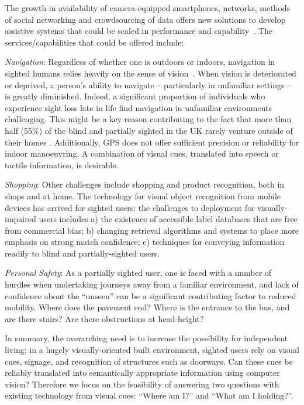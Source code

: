 The growth in availability of camera-equipped smartphones, networks, methods of social networking and crowdsourcing of data offers new solutions to develop assistive systems that could be scaled in performance and capability~\cite{Manduchi2012,Worsfold2010}. The services/capabilities that could be offered include:

\emph{Navigation}: Regardless of whether one is outdoors or indoors, navigation in sighted humans relies heavily on the sense of vision~\citep{kalia2008learning,tsuji2005landmarks}. When vision is deteriorated or deprived, a person's ability to navigate -- particularly in unfamiliar settings -- is greatly diminished. Indeed, a significant proportion of individuals who experience sight loss late in life find navigation in unfamiliar environments challenging. This might be a key reason contributing to the fact that more than half (55\%) of the blind and partially sighted in the UK rarely venture outside of their homes \citep{Worsfold2010}. Additionally, GPS does not offer sufficient precision or reliability for indoor manoeuvring. A combination of visual cues, translated into speech or tactile information, is desirable.

\emph{Shopping}: Other challenges include shopping and product recognition, both in shops and at home. The technology for visual object recognition from mobile devices has arrived for sighted users: the challenges to deployment for visually-impaired users includes a) the existence of accessible label databases that are free from commercial bias; b) changing retrieval algorithms and systems to place more emphasis on strong match confidence; c) techniques for conveying information readily to blind and partially-sighted users.

\emph{Personal Safety}: As a partially sighted user, one is faced with a number of hurdles when undertaking journeys away from a familiar environment, and lack of confidence about the ``unseen'' can be a significant contributing factor to reduced mobility.  Where does the pavement end?  Where is the entrance to the bus, and are there stairs?  Are there obstructions at head-height?   

In summary, the overarching need is to increase the possibility for independent living; in a hugely visually-oriented built environment, sighted users rely on visual cues, signage, and recognition of structures such as doorways.  Can these cues be reliably translated into semantically appropriate information using computer vision? Therefore we focus on the feasibility of answering two questions with existing technology from visual cues: ``Where am I?'' and ``What am I holding?''. 


